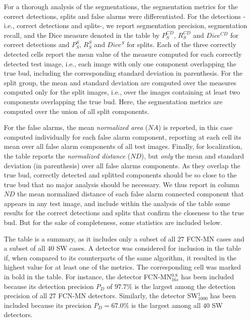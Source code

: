 \documentclass[a4paper,authoryear,review]{elsarticle}
\begin{document}
	For a thorough analysis of the segmentations, the segmentation metrics for the correct detections, splits and false alarms were differentiated. For the detections -i.e., correct detections and splits-, we report segmentation precision, segmentation recall, and the Dice measure denoted in the table by $P_S^{CD}$, $R_S^{CD}$ and $Dice^{CD}$ for correct detections and $P_S^S$, $R_S^S$ and $Dice^S$ for splits.  Each of the three correctly detected cells report the mean value of the measure computed for each correctly detected test image, i.e., each image with only one component overlapping the true bud, including the corresponding standard deviation  in parenthesis. For the split group, the mean and standard deviation are computed over the measures computed only for the split images, i.e., over the images containing at least two components overlapping the true bud. Here, the segmentation metrics are computed over the union of all split components. 
	
	For the false alarms, the mean \emph{normalized area} ($NA$) is reported, in this case computed individually for each false alarm component, reporting at each cell its mean over all false alarm components of all test images. Finally, for localization, the table reports the \emph{normalized distance} ($ND$), but \emph{only} the mean and standard deviation (in parenthesis) over all false alarms components. As they overlap the true bud, correctly detected and splitted components should be so close to the true bud that no major analysis should be necessary. We thus report in column $ND$ the mean normalized distance of each false alarm connected component that appears in any test image, and include within the analysis of the table some results for the correct detections and splits that confirm the closeness to the true bud. But for the sake of completeness,  some statistics are included below. 
	
	The table is a summary, as it includes only a subset of all $27$ FCN-MN cases and a subset of all $40$ SW cases. A detector was considered for inclusion in the table if, when compared to its counterparts of the same algorithm, it resulted in the highest value for at least one of the metrics. The corresponding cell was marked in bold in the table. For instance, the detector FCN-MN$_{16s}^{0.8}$ has been included because its detection precision $P_D$ of $97.7\%$ is the largest among the detection precision of all $27$ FCN-MN detectors. Similarly, the detector SW$_{1000}^1$ has been included because its precision $P_D = 67.0\%$ is the largest among all $40$ SW detectors. 
	
\end{document}
